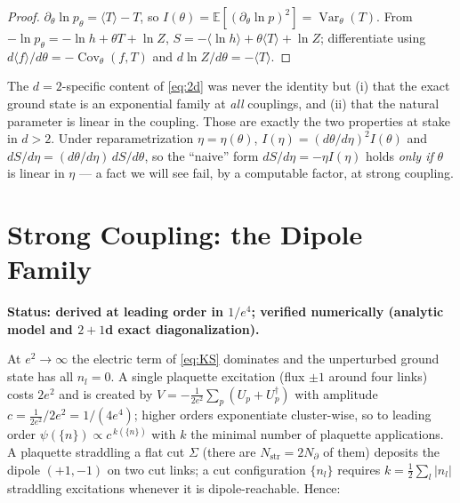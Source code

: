 \documentclass[11pt]{article}
\theoremstyle{remark}
\theoremstyle{plain}
\newcommand{\Var}{\operatorname{Var}}
\newcommand{\Cov}{\operatorname{Cov}}
\begin{document}
\begin{proof}
$\partial_\theta \ln p_\theta = \langle T \rangle - T$, so $I(\theta) = \mathbb{E}[(\partial_\theta \ln p)^2] = \Var_\theta(T)$. From $-\ln p_\theta = -\ln h + \theta T + \ln Z$, $S = -\langle \ln h\rangle + \theta \langle T\rangle + \ln Z$; differentiate using $d\langle f \rangle / d\theta = -\Cov_\theta(f, T)$ and $d \ln Z/d\theta = -\langle T \rangle$.
\end{proof}

The $d=2$-specific content of \eqref{eq:2d} was never the identity but (i) that the exact ground state is an exponential family at \emph{all} couplings, and (ii) that the natural parameter is linear in the coupling. Those are exactly the two properties at stake in $d > 2$. Under reparametrization $\eta = \eta(\theta)$, $I(\eta) = (d\theta/d\eta)^2 I(\theta)$ and $dS/d\eta = (d\theta/d\eta)\, dS/d\theta$, so the ``naive'' form $dS/d\eta = -\eta I(\eta)$ holds \emph{only if} $\theta$ is linear in $\eta$ --- a fact we will see fail, by a computable factor, at strong coupling.

\section{Strong Coupling: the Dipole Family}\label{sec:strong}

\textbf{Status: derived at leading order in $1/e^4$; verified numerically (analytic model and $2{+}1$d exact diagonalization).}

At $e^2 \to \infty$ the electric term of \eqref{eq:KS} dominates and the unperturbed ground state has all $n_l = 0$. A single plaquette excitation (flux $\pm1$ around four links) costs $2e^2$ and is created by $V = -\tfrac{1}{2e^2}\sum_p (U_p + U_p^\dagger)$ with amplitude $c = \tfrac{1}{2e^2} / 2e^2 = 1/(4e^4)$; higher orders exponentiate cluster-wise, so to leading order $\psi(\{n\}) \propto c^{\,k(\{n\})}$ with $k$ the minimal number of plaquette applications. A plaquette straddling a flat cut $\Sigma$ (there are $N_{\mathrm{str}} = 2N_\partial$ of them) deposits the dipole $(+1,-1)$ on two cut links; a cut configuration $\{n_l\}$ requires $k = \tfrac12 \sum_l |n_l|$ straddling excitations whenever it is dipole-reachable. Hence:
\end{document}
